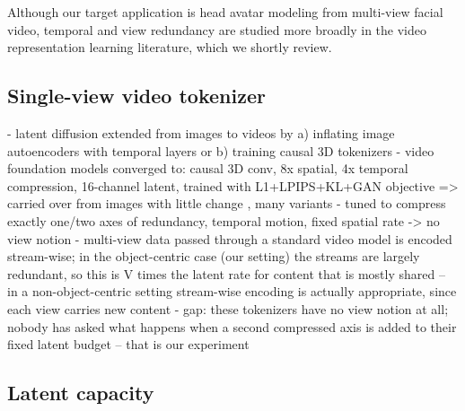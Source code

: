 Although our target application is head avatar modeling from multi-view facial video, temporal and view redundancy are studied more broadly in the video representation learning literature, which we shortly review.

\subsection{Single-view video tokenizer}

- latent diffusion \cite{rombach2022high} extended from images to videos by a) inflating image autoencoders with temporal layers \cite{blattmann2023align} or b) training causal 3D tokenizers \cite{yu2024language}
- video foundation models converged to: causal 3D conv, 8x spatial, 4x temporal compression, 16-channel latent, trained with L1+LPIPS+KL+GAN objective \cite{esser2021taming} => carried over from images with little change \cite{wan2025wan,
yang2024cogvideox, kong2024hunyuanvideo, agarwal2025cosmos}, many variants
- tuned to compress exactly one/two axes of redundancy, temporal motion, fixed spatial rate -> no view notion
- multi-view data passed through a standard video model is encoded stream-wise; in the object-centric case (our setting) the streams are largely redundant, so this is V times the latent rate for content that is mostly shared -- in a non-object-centric setting stream-wise encoding is actually appropriate, since each view carries new content
- gap: these tokenizers have no view notion at all; nobody has asked what happens when a second compressed axis is added to their fixed latent budget -- that is our experiment


\subsection{Latent capacity}

